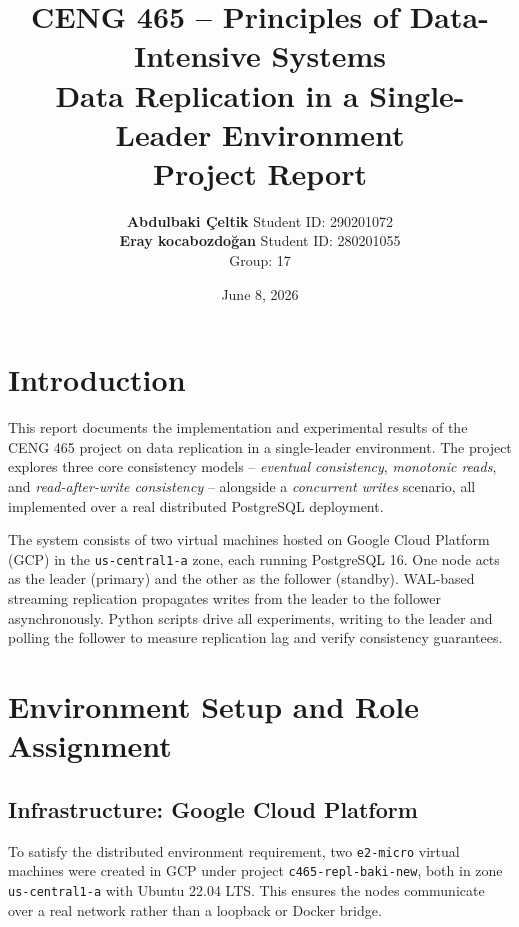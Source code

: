 \documentclass[12pt,a4paper]{article}
\title{
    \vspace{-1cm}
    \large \textbf{CENG 465 -- Principles of Data-Intensive Systems} \\[0.5em]
    \Large \textbf{Data Replication in a Single-Leader Environment} \\[1em]
    \normalsize Project Report
}
\author{
    \textbf{Abdulbaki Çeltik} \quad Student ID: 290201072 \\
    \textbf{Eray kocabozdoğan} \quad Student ID: 280201055 \\[0.5em]
    Group: 17
}
\date{June 8, 2026}
\begin{document}
\maketitle
\thispagestyle{fancy}

\tableofcontents
\newpage

\section{Introduction}

This report documents the implementation and experimental results of the CENG 465 project
on data replication in a single-leader environment. The project explores three core
consistency models -- \textit{eventual consistency}, \textit{monotonic reads}, and
\textit{read-after-write consistency} -- alongside a \textit{concurrent writes} scenario,
all implemented over a real distributed PostgreSQL deployment.

The system consists of two virtual machines hosted on Google Cloud Platform (GCP) in the
\texttt{us-central1-a} zone, each running PostgreSQL 16. One node acts as the
leader (primary) and the other as the follower (standby). WAL-based streaming
replication propagates writes from the leader to the follower asynchronously.
Python scripts drive all experiments, writing to the leader and polling the follower
to measure replication lag and verify consistency guarantees.

\section{Environment Setup and Role Assignment}

\subsection{Infrastructure: Google Cloud Platform}

To satisfy the distributed environment requirement, two \texttt{e2-micro} virtual machines
were created in GCP under project \texttt{c465-repl-baki-new}, both in zone
\texttt{us-central1-a} with Ubuntu 22.04 LTS. This ensures the nodes communicate over
a real network rather than a loopback or Docker bridge.
\end{document}
